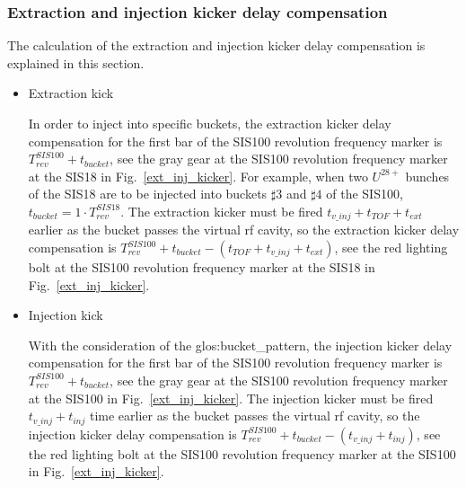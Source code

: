 \subsubsection{Extraction and injection kicker delay compensation}
The calculation of the extraction and injection kicker delay compensation is explained in this section.

\begin{itemize}
\item Extraction kick

In order to inject into specific buckets, the extraction kicker delay compensation for the first bar of the SIS100 revolution frequency marker is $T_{\mathit{rev}}^{\mathit{SIS100}} + t_{\mathit{bucket}}$, see the gray gear at the SIS100 revolution frequency marker at the SIS18 in Fig.~\ref{ext_inj_kicker}. For example, when two $U^{28+}$ bunches of the SIS18 are to be injected into buckets $\sharp3$ and $\sharp4$ of the SIS100, $t_{\mathit{bucket}} =1 \cdot T_{\mathit{rev}}^{\mathit{SIS18}}$. The extraction kicker must be fired $t_{\mathit{v\_inj}}+t_{\mathit{TOF}}+t_{\mathit{ext}}$ earlier as the bucket passes the virtual rf cavity, so the extraction kicker delay compensation is $T_{\mathit{rev}}^{\mathit{SIS100}} + t_{\mathit{bucket}} - (t_{\mathit{TOF}} + t_{\mathit{v\_inj}} + t_{\mathit{ext}})$, see the red lighting bolt at the SIS100 revolution frequency marker at the SIS18 in Fig.~\ref{ext_inj_kicker}. 

\item Injection kick

With the consideration of the \gls{glos:bucket_pattern}, the injection kicker delay compensation for the first bar of the SIS100 revolution frequency marker is $T_{\mathit{rev}}^{\mathit{SIS100}} + t_{\mathit{bucket}}$, see the gray gear at the SIS100 revolution frequency marker at the SIS100 in Fig.~\ref{ext_inj_kicker}. The injection kicker must be fired $t_{\mathit{v\_inj}}+t_{\mathit{inj}}$ time earlier as the bucket passes the virtual rf cavity, so the injection kicker delay compensation is $T_{\mathit{rev}}^{\mathit{SIS100}} + t_{\mathit{bucket}} - (t_{\mathit{v\_inj}} + t_{\mathit{inj}})$, see the red lighting bolt at the SIS100 revolution frequency marker at the SIS100 in Fig.~\ref{ext_inj_kicker}.
\end{itemize}



